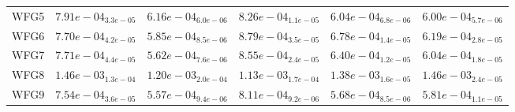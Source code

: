\documentclass{article}
\begin{document}
\begin{table}
\begin{scriptsize}
\begin{tabular}{llllll}
WFG5 & $  7.91e-04_{ 3.3e-05}$ & $  6.16e-04_{ 6.0e-06}$ & $  8.26e-04_{ 1.1e-05}$ & \cellcolor{gray25}$  6.04e-04_{ 6.8e-06}$ & \cellcolor{gray95}$  6.00e-04_{ 5.7e-06}$ \\
WFG6 & $  7.70e-04_{ 4.2e-05}$ & \cellcolor{gray95}$  5.85e-04_{ 8.5e-06}$ & $  8.79e-04_{ 3.5e-05}$ & $  6.78e-04_{ 1.4e-05}$ & \cellcolor{gray25}$  6.19e-04_{ 2.8e-05}$ \\
WFG7 & $  7.71e-04_{ 4.4e-05}$ & \cellcolor{gray95}$  5.62e-04_{ 7.6e-06}$ & $  8.55e-04_{ 2.4e-05}$ & $  6.40e-04_{ 1.2e-05}$ & \cellcolor{gray25}$  6.04e-04_{ 1.8e-05}$ \\
WFG8 & $  1.46e-03_{ 1.3e-04}$ & \cellcolor{gray25}$  1.20e-03_{ 2.0e-04}$ & \cellcolor{gray95}$  1.13e-03_{ 1.7e-04}$ & $  1.38e-03_{ 1.6e-05}$ & $  1.46e-03_{ 2.4e-05}$ \\
WFG9 & $  7.54e-04_{ 3.6e-05}$ & \cellcolor{gray95}$  5.57e-04_{ 9.4e-06}$ & $  8.11e-04_{ 9.2e-06}$ & \cellcolor{gray25}$  5.68e-04_{ 8.5e-06}$ & $  5.81e-04_{ 1.1e-05}$ \\
\hline
\end{tabular}
\end{scriptsize}
\end{table}
\end{document}
